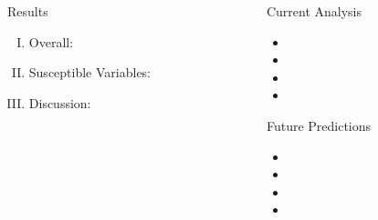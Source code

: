 \documentclass[final]{beamer}\usepackage[]{graphicx}\usepackage[]{color}
\begin{document}
\begin{frame}[fragile]
\begin{columns}[t]
\begin{column}{0.23\linewidth}
\begin{minipage}[t][.955\textheight]{\linewidth}
\begin{block}{Results}

\begin{enumerate}[I.]
\item Overall:


\item Susceptible Variables:


\item Discussion:


\end{enumerate}
\vspace{0ex}

\end{block}
\vfill


\end{minipage}
\end{column}%


\begin{column}{0.23\linewidth}
\begin{minipage}[t][.955\textheight]{\linewidth} 

\vspace{0ex}
\begin{block}{Current Analysis}
\vspace{0ex}
\begin{itemize}
\item
\item
\item
\item
\end{itemize}
\vspace{0ex}
\end{block}
\vfill

\begin{block}{Future Predictions}
\begin{itemize}
\item
\item
\item
\item
\end{itemize}
\vspace{0ex}
\vfill
\end{block}
\vfill


\end{minipage}
\end{column}
\end{columns}
\end{frame}
\end{document}
